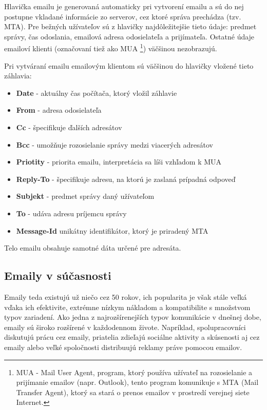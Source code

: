 \documentclass[slovak,master,public,dept460,male,cpdeclaration,oneside]{diploma}
\begin{document}
Hlavička emailu je generovaná automaticky pri vytvorení emailu a sú do nej postupne vkladané informácie zo serverov, cez ktoré správa prechádza (tzv. MTA). Pre bežných užívateľov sú z hlavičky najdôležitejšie tieto údaje: predmet správy, čas odoslania, emailová adresa odosielateľa a prijímateľa. Ostatné údaje emailoví klienti (označovaní tiež ako MUA \footnote{MUA - Mail User Agent, program, ktorý používa užívateľ na rozosielanie a prijímanie emailov (napr. Outlook), tento program komunikuje s MTA (Mail Transfer Agent), ktorý sa stará o prenos emailov v prostredí verejnej siete Internet.}) väčšinou nezobrazujú.


Pri vytváraní emailu emailovým klientom sú väčšinou do hlavičky vložené tieto záhlavia:

\begin{itemize}
\item \textbf{Date} - aktuálny čas počítača, ktorý vložil záhlavie
\item \textbf{From} - adresa odosielateľa
\item \textbf{Cc} - špecifikuje ďalších adresátov
\item \textbf{Bcc} - umožňuje rozosielanie správy medzi viacerých adresátov
\item \textbf{Priotity} - priorita emailu, interpretácia sa líši vzhľadom k MUA
\item \textbf{Reply-To} - špecifikuje adresu, na ktorú je zaslaná prípadná odpoveď
\item \textbf{Subjekt} - predmet správy daný užívateľom
\item \textbf{To} - udáva adresu príjemcu správy
\item \textbf{Message-Id} unikátny identifikátor, ktorý je priradený MTA
\end{itemize}

Telo emailu obsahuje samotné dáta určené pre adresáta. 


\subsection{Emaily v súčasnosti}
Emaily teda existujú už niečo cez 50 rokov, ich popularita je však stále veľká vďaka ich efektivite, extrémne nízkym nákladom a kompatibilite s množstvom typov zariadení. Ako jedna z najrozšírenejších typov komunikácie v dnešnej dobe, emaily sú široko rozšírené v každodennom živote. Napríklad, spolupracovníci diskutujú prácu cez emaily, priatelia zdieľajú sociálne aktivity a skúsenosti aj cez emaily alebo veľké spoločnosti distribuujú reklamy práve pomocou emailov.
\end{document}
